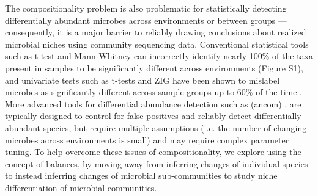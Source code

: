 The compositionality problem is also problematic for statistically detecting differentially abundant microbes across environments or between groups — consequently, it is a major barrier to reliably drawing conclusions about realized microbial niches using community sequencing data. Conventional statistical tools such as t-test and Mann-Whitney can incorrectly identify nearly 100\% of the taxa present in samples to be significantly different across environments (Figure S1), and univariate tests such as t-tests and ZIG \cite{metagenomeSeq} have been shown to mislabel microbes as significantly different across sample groups up to 60\% of the time \cite{ancom}. More advanced tools for differential abundance detection such as (\gls{ancom}) \cite{ancom}, are typically designed to control for false-positives and reliably detect differentially abundant species, but require multiple assumptions (i.e. the number of changing microbes across environments is small) and may require complex parameter tuning. To help overcome these issues of compositionality, we explore using the concept of balances, by moving away from inferring changes of individual species to instead inferring changes of microbial sub-communities to study niche differentiation of microbial communities.\par
